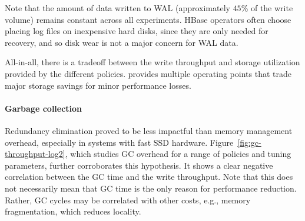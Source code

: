 Note that the amount of data written to WAL %
(approximately $45$\% of the write volume) remains constant across all  experiments. 
HBase operators often choose placing log files on inexpensive hard disks, since they are only needed for recovery,
and so disk wear is not a major concern for WAL data.

All-in-all, there is a tradeoff between the write throughput and storage utilization 
provided by the different \sys\/ policies. \adp\/ provides multiple operating points that trade major 
storage savings for minor performance losses.

\paragraph{Garbage collection}
 Redundancy elimination proved to be less impactful 
than memory management overhead, especially in systems with fast SSD hardware. 
Figure~\ref{fig:gc-throughput-log2}, which studies GC overhead for a range of policies and tuning 
parameters, further corroborates this hypothesis. It shows a clear negative correlation between the 
GC time and the write throughput. 
Note that this does not necessarily mean that GC time is the only reason for performance reduction. Rather,
GC cycles may be correlated with other costs, e.g., memory fragmentation, which reduces locality.


